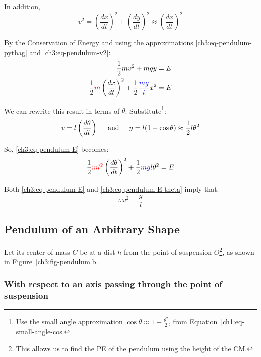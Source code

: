 In addition,
\begin{equation}
v^2=\left( \frac{dx}{dt} \right)^2 + \left(\frac{dy}{dt} \right)^2
\approx  \left( \frac{dx}{dt} \right)^2 \label{ch3:eq-pendulum-v2}
\end{equation}

By the Conservation of Energy and using the approximations \eqref{ch3:eq-pendulum-pythag} and  \eqref{ch3:eq-pendulum-v2}:
\begin{align}
\frac{1}{2} mv^2 + mgy &= E \notag \\
\frac{1}{2} \textcolor{red}{m} \left( \frac{dx}{dt} \right)^2 + \frac{1}{2} \textcolor{blue}{\frac{mg}{l}} x^2 &= E  \label{ch3:eq-pendulum-E}
\end{align}


We can rewrite this result in terms of $\theta$. Substitute\footnote{Use the small angle approximation $\cos\theta \approx 1-\frac{\theta^2}{2}$, from Equation~\eqref{ch1:eq-small-angle-cos}}:
\begin{equation*}
v = l\left(\frac{d\theta}{dt}\right) \hspace{0.5cm}\text{and}\hspace{0.5cm}
y = l(1-\cos\theta) \approx \frac{1}{2}l\theta ^2
\end{equation*}

So, \eqref{ch3:eq-pendulum-E} becomes:
\begin{equation}
	\frac{1}{2} \textcolor{red}{ml^2} \left( \frac{d\theta}{dt} \right)^2 + \frac{1}{2} \textcolor{blue}{mgl} \theta^2 = E \label{ch3:eq-pendulum-E-theta}
\end{equation}

Both \eqref{ch3:eq-pendulum-E} and \eqref{ch3:eq-pendulum-E-theta} imply that:
\begin{equation}
	\therefore \omega^2 = \frac{g}{l} \label{ch3:eq-simple-pendulum-result}
\end{equation}


\subsection{Pendulum of an Arbitrary Shape} \label{ch3:sec-complex-pendulum}
Let its center of mass $C$ be at a dist $h$ from the point of suspension $O$\footnote{This allows us to find the PE of the pendulum using the height of the CM.}, as shown in Figure~\ref{ch3:fig-pendulum}b.

\subsubsection{With respect to an axis passing through the point of suspension}


